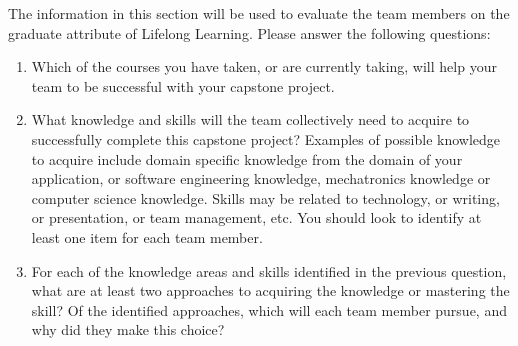 \documentclass[12pt]{article}
\begin{document}
The information in this section will be used to evaluate the team members on the
graduate attribute of Lifelong Learning.  Please answer the following questions:

\begin{enumerate}
  \item Which of the courses you have taken, or are currently taking, will help
  your team to be successful with your capstone project.
  \item What knowledge and skills will the team collectively need to acquire to
  successfully complete this capstone project?  Examples of possible knowledge
  to acquire include domain specific knowledge from the domain of your
  application, or software engineering knowledge, mechatronics knowledge or
  computer science knowledge.  Skills may be related to technology, or writing,
  or presentation, or team management, etc.  You should look to identify at
  least one item for each team member.
  \item For each of the knowledge areas and skills identified in the previous
  question, what are at least two approaches to acquiring the knowledge or
  mastering the skill?  Of the identified approaches, which will each team
  member pursue, and why did they make this choice?
\end{enumerate}
\end{document}
